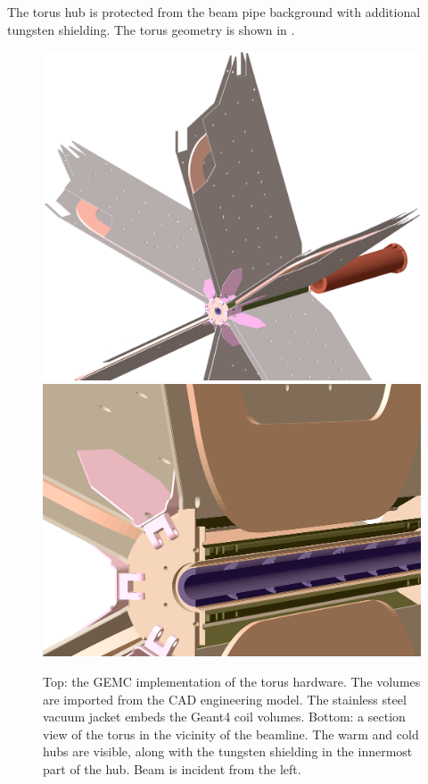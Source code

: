 The torus hub is protected from the beam pipe background with additional tungsten shielding. The torus geometry is
shown in .

\begin{figure}
	\centering
	\includegraphics[width=0.99\columnwidth,keepaspectratio]{img/torusGeometry.png}
	\includegraphics[width=0.99\columnwidth,keepaspectratio]{img/torusDetail.png}
	\caption{Top: the GEMC implementation of the torus hardware. The volumes are imported from the CAD engineering
          model. The stainless steel vacuum jacket embeds the Geant4 coil volumes. Bottom: a section view of the torus in the
          vicinity of the beamline. The warm and cold hubs are visible, along with the tungsten shielding in the innermost part
          of the hub. Beam is incident from the left.}
	\label{fig:torus}
\end{figure}

